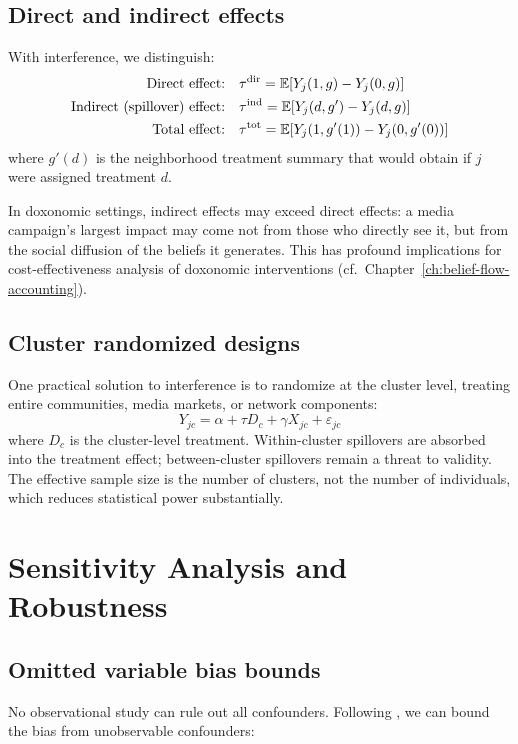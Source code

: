 \subsection{Direct and indirect effects}

With interference, we distinguish:
\begin{align}
  \text{Direct effect:} &\quad \tau^{\text{dir}} = \mathbb{E}[Y_j(1, g) - Y_j(0, g)] \\
  \text{Indirect (spillover) effect:} &\quad \tau^{\text{ind}} = \mathbb{E}[Y_j(d, g') - Y_j(d, g)] \\
  \text{Total effect:} &\quad \tau^{\text{tot}} = \mathbb{E}[Y_j(1, g'(1)) - Y_j(0, g'(0))]
\end{align}
where $g'(d)$ is the neighborhood treatment summary that would obtain if $j$ were assigned treatment $d$.

In doxonomic settings, indirect effects may exceed direct effects: a media campaign's largest impact may come not from those who directly see it, but from the social diffusion of the beliefs it generates.
This has profound implications for cost-effectiveness analysis of doxonomic interventions (cf.\ Chapter~\ref{ch:belief-flow-accounting}).

\subsection{Cluster randomized designs}

One practical solution to interference is to randomize at the cluster level, treating entire communities, media markets, or network components:
\[
  Y_{jc} = \alpha + \tau D_c + \gamma X_{jc} + \varepsilon_{jc}
\]
where $D_c$ is the cluster-level treatment.
Within-cluster spillovers are absorbed into the treatment effect; between-cluster spillovers remain a threat to validity.
The effective sample size is the number of clusters, not the number of individuals, which reduces statistical power substantially.

\section{Sensitivity Analysis and Robustness}
\label{sec:ch16-sensitivity}

\subsection{Omitted variable bias bounds}

No observational study can rule out all confounders.
Following \textcite{oster2019}, we can bound the bias from unobservable confounders:

